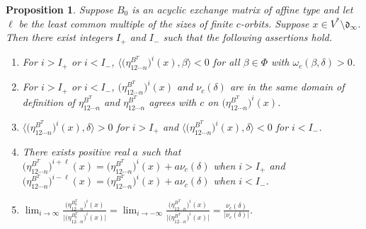 \documentclass[10pt]{article}
\newtheorem{proposition}{Proposition}[section]
\theoremstyle{definition}
\theoremstyle{remark}
\numberwithin{equation}{section}
\newcommand{\br}[1]{{\langle #1 \rangle}}
\newcommand{\brr}[1]{{\bigl\langle #1 \bigr\rangle}}
\newcommand{\F}{{\mathcal F}}
\newcommand{\0}{{\mathbf{0}}}
\renewcommand{\d}{{\mathfrak d}}
\newcommand{\RSChar}{\Phi}
\newcommand{\RS}{\RSChar}
\newcommand{\AP}[1]{\RS_{#1}}
\begin{document}
%
\begin{proposition}\label{delta limit eta}
Suppose $B_0$ is an acyclic exchange matrix of affine type and let $\ell$ be the least common multiple of the sizes of finite $c$-orbits.
Suppose $x\in V^*\setminus\d_\infty$.
Then there exist integers $I_+$ and $I_-$ such that the following assertions hold.
\begin{enumerate}[label=\bf\arabic*., ref=\arabic*]
\item \label{in big dinf}
For $i>I_+$ or $i<I_-$, $\br{\bigl(\eta_{12\cdots n}^{B^T}\bigr)^i(x),\beta}<0$ for all $\beta\in\RS$ with $\omega_c(\beta,\delta)>0$.
\item \label{c agree}
For $i>I_+$ or $i<I_-$, $\bigl(\eta_{12\cdots n}^{B^T}\bigr)^i(x)$ and $\nu_c(\delta)$ are in the same domain of definition of $\eta_{12\cdots n}^{B^T}$ and $\eta_{12\cdots n}^{B^T}$ agrees with $c$ on $\bigl(\eta_{12\cdots n}^{B^T}\bigr)^i(x)$.
\item \label{correct side}
$\brr{\bigl(\eta_{12\cdots n}^{B^T}\bigr)^i(x),\delta}>0$ for $i>I_+$ and $\brr{\bigl(\eta_{12\cdots n}^{B^T}\bigr)^i(x),\delta}<0$ for $i<I_-$.
\item \label{pos a}
There exists positive real $a$ such that $\bigl(\eta_{12\cdots n}^{B^T}\bigr)^{i+\ell}(x)=\bigl(\eta_{12\cdots n}^{B^T}\bigr)^i(x)+a\nu_c(\delta)$ when $i>I_+$ and $\bigl(\eta_{12\cdots n}^{B^T}\bigr)^{i-\ell}(x)=\bigl(\eta_{12\cdots n}^{B^T}\bigr)^i(x)+a\nu_c(\delta)$ when $i<I_-$.
\item \label{eta lim}
$\displaystyle\lim_{i\to\infty}\frac{\bigl(\eta_{12\cdots n}^{B_0^T}\bigr)^i(x)}{\bigl|\bigl(\eta_{12\cdots n}^{B_0^T}\bigr)^i(x)\bigr|}=\lim_{i\to-\infty}\frac{\bigl(\eta_{12\cdots n}^{B^T}\bigr)^i(x)}{\bigl|\bigl(\eta_{12\cdots n}^{B^T}\bigr)^i(x)\bigr|}=\frac{\nu_c(\delta)}{|\nu_c(\delta)|}$.
\end{enumerate}
\end{proposition}
\end{document}
